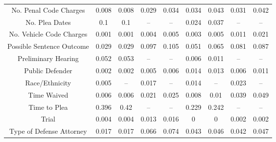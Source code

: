 \begin{table*}[]
\begin{tabular}{@{}ccccc@{\qquad}cccc@{}}
No. Penal Code Charges    & 0.008                 & 0.008                & 0.029                & 0.034                  & 0.034                 & 0.043                & 0.031                & 0.042                \\
No. Plea Dates            & 0.1                   & 0.1                  & --                   & --                     & 0.024                 & 0.037                & --                   & --                   \\
No. Vehicle Code Charges  & 0.001                 & 0.001                & 0.004                & 0.005                  & 0.003                 & 0.005                & 0.011                & 0.021                \\
Possible Sentence Outcome & 0.029                 & 0.029                & 0.097                & 0.105                  & 0.051                 & 0.065                & 0.081                & 0.087                \\
Preliminary Hearing       & 0.052                 & 0.053                & --                   & --                     & 0.006                 & 0.011                & --                   & --                   \\
Public Defender           & 0.002                 & 0.002                & 0.005                & 0.006                  & 0.014                 & 0.013                & 0.006                & 0.011                \\
Race/Ethnicity            & 0.005                 & --                   & 0.017                & --                     & 0.014                 & --                   & 0.023                & --                   \\
Time Waived               & 0.006                 & 0.006                & 0.021                & 0.025                  & 0.008                 & 0.01                 & 0.039                & 0.049                \\
Time to Plea              & 0.396                 & 0.42                 & --                   & --                     & 0.229                 & 0.242                & --                   & --                   \\
Trial                     & 0.004                 & 0.004                & 0.013                & 0.016                  & 0                     & 0                    & 0.002                & 0.002                \\
Type of Defense Attorney  & 0.017                 & 0.017                & 0.066                & 0.074                  & 0.043                 & 0.046                & 0.042                & 0.047                \\

\end{tabular}
\end{table*}
